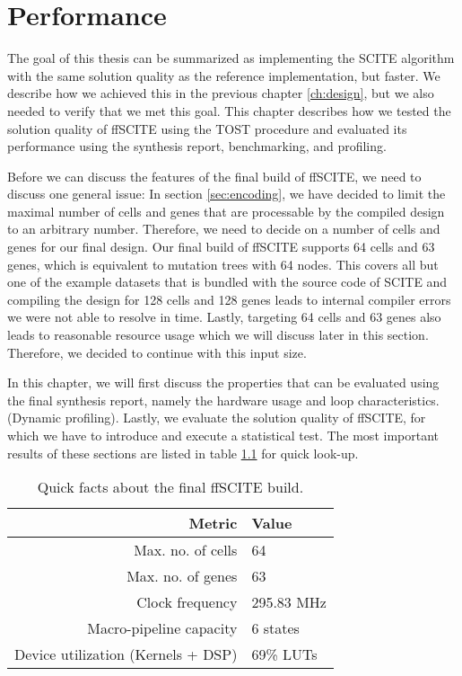 \chapter{Performance}
\label{ch:performance}

The goal of this thesis can be summarized as implementing the \ac{SCITE} algorithm with the same solution quality as the reference implementation, but faster. We describe how we achieved this in the previous chapter \ref{ch:design}, but we also needed to verify that we met this goal. This chapter describes how we tested the solution quality of \ac{ffSCITE} using the \ac{TOST} procedure \cite{schuirmann1987comparison} and evaluated its performance using the synthesis report, benchmarking, and profiling. 

Before we can discuss the features of the final build of \ac{ffSCITE}, we need to discuss one general issue: In section \ref{sec:encoding}, we have decided to limit the maximal number of cells and genes that are processable by the compiled design to an arbitrary number. Therefore, we need to decide on a number of cells and genes for our final design. Our final build of \ac{ffSCITE} supports 64 cells and 63 genes, which is equivalent to mutation trees with 64 nodes. This covers all but one of the example datasets that is bundled with the source code of \ac{SCITE} and compiling the design for 128 cells and 128 genes leads to internal compiler errors we were not able to resolve in time. Lastly, targeting 64 cells and 63 genes also leads to reasonable resource usage which we will discuss later in this section. Therefore, we decided to continue with this input size.

In this chapter, we will first discuss the properties that can be evaluated using the final synthesis report, namely the hardware usage and loop characteristics. (Dynamic profiling). Lastly, we evaluate the solution quality of \ac{ffSCITE}, for which we have to introduce and execute a statistical test. The most important results of these sections are listed in table \ref{tab:quickfacts} for quick look-up.

\begin{table}
    \centering
    \begin{tabular}{r|l}
        \textbf{Metric}                     & \textbf{Value} \\
        \hline
        Max. no. of cells                   & 64 \\
        Max. no. of genes                   & 63 \\
        Clock frequency                     & 295.83 MHz \\
        Macro-pipeline capacity             & 6 states \\
        Device utilization (Kernels + DSP)  & 69\% \acsp{LUT}
    \end{tabular}
    \caption{Quick facts about the final \ac{ffSCITE} build.}
    \label{tab:quickfacts}
\end{table}




